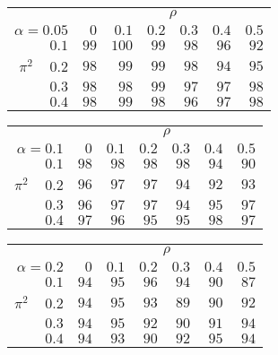 \begin{tabular}{r|rrrrrr}
\hline\hline
 &\multicolumn{6}{c}{$\rho$} \\ 
 $\alpha = 0.05$ & $0$ & $0.1$ & $0.2$ & $0.3$ & $0.4$ & $0.5$ \\ 
 \hline$0.1$ & $ 99$ & $100$ & $ 99$ & $ 98$ & $ 96$ & $ 92$\\ 
$\pi^2\;\;\;$ $0.2$ & $ 98$ & $ 99$ & $ 99$ & $ 98$ & $ 94$ & $ 95$\\ 
$0.3$ & $ 98$ & $ 98$ & $ 99$ & $ 97$ & $ 97$ & $ 98$\\ 
$0.4$ & $ 98$ & $ 99$ & $ 98$ & $ 96$ & $ 97$ & $ 98$\\ 
 \hline 
 \end{tabular}
 
 \vspace{2em} 
 
\begin{tabular}{r|rrrrrr}
\hline\hline
 &\multicolumn{6}{c}{$\rho$} \\ 
 $\alpha = 0.1$ & $0$ & $0.1$ & $0.2$ & $0.3$ & $0.4$ & $0.5$ \\ 
 \hline$0.1$ & $98$ & $98$ & $98$ & $98$ & $94$ & $90$\\ 
$\pi^2\;\;\;$ $0.2$ & $96$ & $97$ & $97$ & $94$ & $92$ & $93$\\ 
$0.3$ & $96$ & $97$ & $97$ & $94$ & $95$ & $97$\\ 
$0.4$ & $97$ & $96$ & $95$ & $95$ & $98$ & $97$\\ 
 \hline 
 \end{tabular}
 
 \vspace{2em} 
 
\begin{tabular}{r|rrrrrr}
\hline\hline
 &\multicolumn{6}{c}{$\rho$} \\ 
 $\alpha = 0.2$ & $0$ & $0.1$ & $0.2$ & $0.3$ & $0.4$ & $0.5$ \\ 
 \hline$0.1$ & $94$ & $95$ & $96$ & $94$ & $90$ & $87$\\ 
$\pi^2\;\;\;$ $0.2$ & $94$ & $95$ & $93$ & $89$ & $90$ & $92$\\ 
$0.3$ & $94$ & $95$ & $92$ & $90$ & $91$ & $94$\\ 
$0.4$ & $94$ & $93$ & $90$ & $92$ & $95$ & $94$\\ 
 \hline 
 \end{tabular}